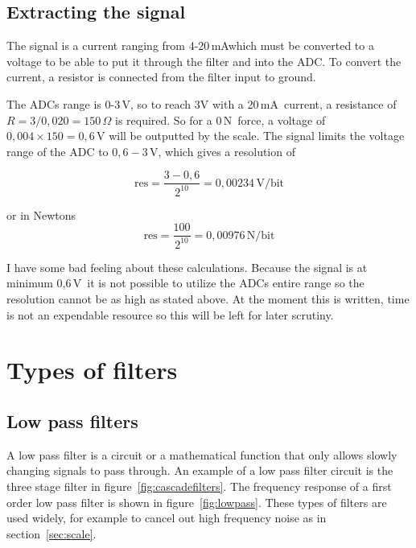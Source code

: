 \documentclass[11pt,a4paper,titlepage]{article}
\newcommand{\mA}{\,\textrm{mA}}
\newcommand{\N}{\,\textrm{N}}
\newcommand{\V}{\,\textrm{V}}
\newcommand{\Ohms}{\,\Omega}
\newcommand{\VperBit}{\,\textrm{V/bit}}
\newcommand{\NperBit}{\,\textrm{N/bit}}
\begin{document}
	\subsection{Extracting the signal}
	
	The signal is a current ranging from 4-20\mA which must be converted to a voltage to be able to put it through the filter and into the ADC. To convert the current, a resistor is connected from the filter input to ground.
	
	The ADCs range is 0-3\V, so to reach 3V with a 20\mA\ current, a resistance of $R = 3/0,020 = 150\Ohms$ is required. So for a 0\N\ force, a voltage of $0,004 \times 150 = 0,6\V$ will be outputted by the scale.
	The signal limits the voltage range of the ADC to $0,6 - 3\V$, which gives a resolution of 
	
	\begin{equation}
		\text{res} = \frac{3 - 0,6}{2^{10}} = 0,00234\VperBit
	\end{equation}
	
	\noindent or in Newtons
	\begin{equation}
		\text{res} = \frac{100}{2^{10}} = 0,00976\NperBit
	\end{equation}
	
	I have some bad feeling about these calculations. Because the signal is at minimum 0,6\V\, it is not possible to utilize the ADCs entire range so the resolution cannot be as high as stated above. At the moment this is written, time is not an expendable resource so this will be left for later scrutiny.
	
	
	\section{Types of filters}
	\subsection{Low pass filters}
	A low pass filter is a circuit or a mathematical function that only allows slowly changing signals to pass through. An example of a low pass filter circuit is the three stage filter in figure~\ref{fig:cascadefilters}.
	The frequency response of a first order low pass filter is shown in figure~\ref{fig:lowpass}. These types of filters are used widely, for example to cancel out high frequency noise as in section~\ref{sec:scale}.
	
\end{document}
